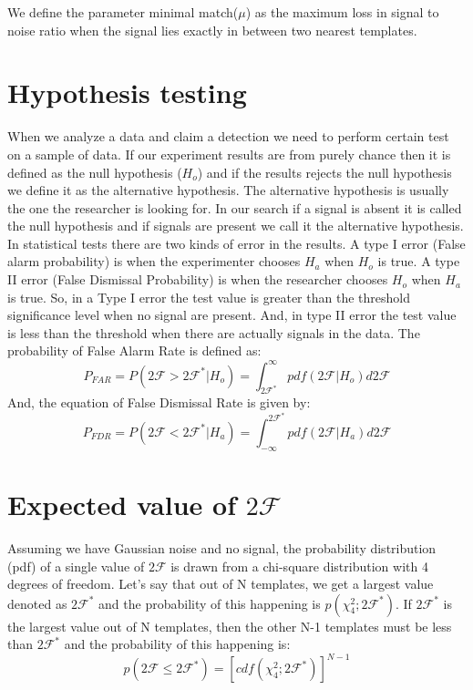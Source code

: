 \documentclass{ttuthes2007}
\begin{document}
We define the parameter minimal match($\mu$) as the maximum loss in signal to
noise ratio when the signal lies exactly in between two nearest templates. 
\section{Hypothesis testing}                                                    
        When we analyze a data and claim a detection we need to perform certain
test on a sample of data. If our experiment results are from purely chance then
it is defined as the null hypothesis ($H_o$) and if the results rejects the null
hypothesis we define it as the alternative hypothesis. The alternative
hypothesis is
usually the one the researcher is looking for.  In our search if a signal is absent it is
called the null hypothesis and if signals are present we call it the alternative
hypothesis.
	In statistical tests there are two kinds of error in the
results. A type I error (False alarm probability) is when the experimenter
chooses $H_a$ when $H_o$ is true. A type II error (False Dismissal
Probability) is when the researcher chooses $H_o$ when $H_a$ is true.  So, in
a Type I error the test value is greater than the threshold significance level
when no signal are present. And, in type II error the test value is less than
the threshold when there are actually signals in the data.
The probability of False Alarm Rate is defined as:
\begin{equation}
P_{FAR}=P(2\mathcal{F}>2\mathcal{F}^*|H_o)=\int_{2\mathcal{F}^*}^\infty
pdf(2\mathcal{F}|H_o)d2\mathcal{F}
\end{equation}
And, the equation of False Dismissal Rate is given by:
\begin{equation}
P_{FDR}=P(2\mathcal{F}<2\mathcal{F}^*|H_a)=\int_{-\infty}^{2\mathcal{F}^*}
pdf(2\mathcal{F}|H_a)d2\mathcal{F}
\end{equation}



\section{Expected value of $2\mathcal{F}$}
Assuming we have Gaussian noise and no signal, the probability distribution
(pdf) of a single value of $2\mathcal{F}$ is drawn from a chi-square distribution with 4
degrees of freedom.  Let's say that out of N templates, we get a largest value
denoted as $2\mathcal{F}^*$ and the probability of this happening is
$p(\chi^2_4;2\mathcal{F}^*)$. If $2\mathcal{F}^*$ is the largest value out of N
templates, then the other N-1 templates must be less than $2\mathcal{F}^*$ and
the probability of this happening is:
\begin{equation}
p(2\mathcal{F}\leq2\mathcal{F}^*)= [cdf(\chi^2_4;2\mathcal{F}^*)]^{N-1}
\end{equation} 
\end{document}
